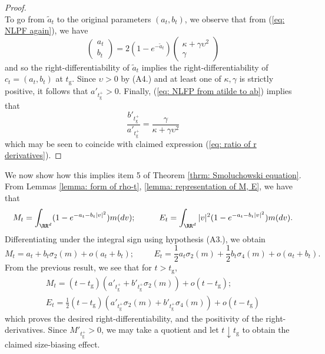 \begin{proof}
\begin{equation}
 \end{equation} To go from $\widetilde{a}_t$ to the original parameters $(a_t, b_t)$, we observe that from (\ref{eq: NLPF again}), we have \begin{equation}\label{eq: NLFP from atilde to ab} \left(\begin{matrix} a_t\\b_t \end{matrix}\right)=2(1-e^{-\widetilde{a}_t})\left(\begin{matrix} \kappa+\gamma\upsilon^2 \\ \gamma \end{matrix}\right) \end{equation} and so the right-differentiability of $\widetilde{a}_t$ implies the right-differentiability of $c_t=(a_t, b_t)$ at $t_\mathrm{g}.$ Since $\upsilon>0$ by (A4.) and at least one of $\kappa, \gamma$ is strictly positive, it follows that $a'_{t_\mathrm{g}^+}>0$. Finally, (\ref{eq: NLFP from atilde to ab}) implies that \begin{equation} \frac{b'_{t_\mathrm{g}^+}}{a'_{t_\mathrm{g}^+}}=\frac{\gamma}{\kappa+\gamma\upsilon^2} \end{equation} which may be seen to coincide with claimed expression (\ref{eq: ratio of r derivatives}). \end{proof} We now show how this implies item 5 of Theorem \ref{thrm: Smoluchowski equation}. From  Lemmas \ref{lemma: form of rho-t}, \ref{lemma: representation of M, E}, we have that \begin{equation} M_t=\int_{\RR^d}(1-e^{-a_t-b_t|v|^2})m(dv); \hspace{1cm} E_t=\int_{\RR^d}|v|^2(1-e^{-a_t-b_t|v|^2})m(dv). \end{equation} Differentiating under the integral sign using hypothesis (A3.), we obtain \begin{equation}
    M_t=a_t+b_t\sigma_2(m)+o(a_t+b_t); \hspace{1cm} E_t=\frac{1}{2}a_t\sigma_2(m)+\frac{1}{2}b_t\sigma_4(m)+o(a_t+b_t).
\end{equation} From the previous result, we see that for $t>t_\mathrm{g}$, \begin{gather} M_t=(t-t_\mathrm{g})(a'_{t_\mathrm{g}^+}+b'_{t_\mathrm{g}^+}\sigma_2(m))+o(t-t_\mathrm{g}); \\[1ex] E_t=\frac{1}{2}(t-t_\mathrm{g})(a'_{t_\mathrm{g}^+}\sigma_2(m)+b'_{t_\mathrm{g}^+}\sigma_4(m))+o(t-t_\mathrm{g})\end{gather} which proves the desired right-differentiability, and the positivity of the right-derivatives. Since $M'_{t_\mathrm{g}^+}>0$, we may take a quotient and let $t\downarrow t_\mathrm{g}$ to obtain the claimed size-biasing effect. 